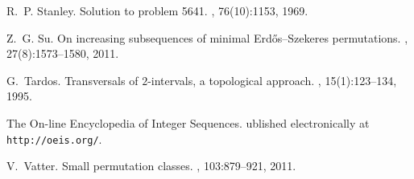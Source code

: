 \documentclass[
final
, nomarks
]{dmtcs-episciences}
\begin{document}
\begin{thebibliography}{10}
R.~P. Stanley.
\newblock Solution to problem 5641.
, 76(10):1153, 1969.

Z.~G. Su.
\newblock On increasing subsequences of minimal {E}rd{\H{o}}s--{S}zekeres
  permutations.
, 27(8):1573--1580, 2011.

G.~Tardos.
\newblock Transversals of {$2$}-intervals, a topological approach.
, 15(1):123--134, 1995.

{The {O}n-line {E}ncyclopedia of {I}nteger {S}equences}.
ublished electronically at \texttt{http://oeis.org/}.

V.~Vatter.
\newblock Small permutation classes.
, 103:879--921, 2011.

\end{thebibliography}
\end{document}
